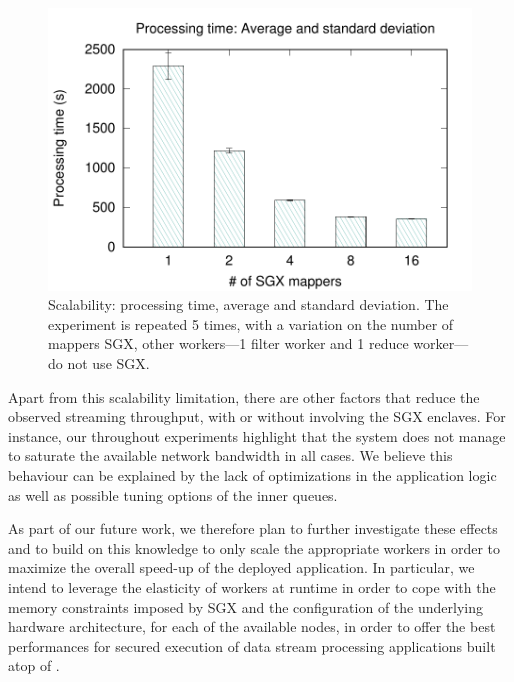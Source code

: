 \begin{figure}[t!]
  \centering  \includegraphics[width=\linewidth]{plots/secure_streams/scalability/sgxmapper_scalability}
  \caption{Scalability: processing time, average and standard deviation. The experiment is repeated 5 times, with a variation on the number of mappers SGX, other workers---1 filter worker and 1 reduce worker---do not use SGX.}
  \label{fig:scalability:sgxmapper}
\end{figure}

Apart from this scalability limitation, there are other factors that reduce the observed streaming throughput, with or without involving the SGX enclaves.
For instance, our throughout experiments highlight that the system does not manage to saturate the available network bandwidth in all cases.
We believe this behaviour can be explained by the lack of optimizations in the application logic as well as possible tuning options of the inner \zmq{} queues.

As part of our future work, we therefore plan to further investigate these effects and to build on this knowledge to only scale the appropriate workers in order to maximize the overall speed-up of the deployed application.
In particular, we intend to leverage the elasticity of workers at runtime in order to cope with the memory constraints imposed by SGX and the configuration of the underlying hardware architecture, for each of the available nodes, in order to offer the best performances for secured execution of data stream processing applications built atop of \SYS{}.



